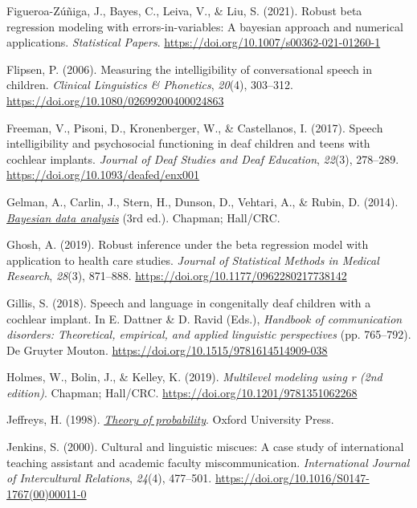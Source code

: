 \documentclass[
]{agujournal2019}
\newlength{\cslhangindent}
\newenvironment{CSLReferences}[2] %
 {\begin{list}{}{%
  \setlength{\itemindent}{0pt}
  \setlength{\leftmargin}{0pt}
  \setlength{\parsep}{0pt}
  \ifodd #1
   \setlength{\leftmargin}{\cslhangindent}
   \setlength{\itemindent}{-1\cslhangindent}
  \fi
  \setlength{\itemsep}{#2\baselineskip}}}
 {\end{list}}
\begin{document}
\begin{CSLReferences}{1}{0}
Figueroa-Zúñiga, J., Bayes, C., Leiva, V., \& Liu, S. (2021). Robust
beta regression modeling with errors-in-variables: A bayesian approach
and numerical applications. \emph{Statistical Papers}.
\url{https://doi.org/10.1007/s00362-021-01260-1}

Flipsen, P. (2006). Measuring the intelligibility of conversational
speech in children. \emph{Clinical Linguistics \& Phonetics},
\emph{20}(4), 303--312. \url{https://doi.org/10.1080/02699200400024863}

Freeman, V., Pisoni, D., Kronenberger, W., \& Castellanos, I. (2017).
Speech intelligibility and psychosocial functioning in deaf children and
teens with cochlear implants. \emph{Journal of Deaf Studies and Deaf
Education}, \emph{22}(3), 278--289.
\url{https://doi.org/10.1093/deafed/enx001}

Gelman, A., Carlin, J., Stern, H., Dunson, D., Vehtari, A., \& Rubin, D.
(2014). \emph{\href{}{Bayesian data analysis}} (3rd ed.). Chapman;
Hall/CRC.

Ghosh, A. (2019). Robust inference under the beta regression model with
application to health care studies. \emph{Journal of Statistical Methods
in Medical Research}, \emph{28}(3), 871--888.
\url{https://doi.org/10.1177/0962280217738142}

Gillis, S. (2018). Speech and language in congenitally deaf children
with a cochlear implant. In E. Dattner \& D. Ravid (Eds.),
\emph{Handbook of communication disorders: Theoretical, empirical, and
applied linguistic perspectives} (pp. 765--792). De Gruyter Mouton.
\url{https://doi.org/10.1515/9781614514909-038}

Holmes, W., Bolin, J., \& Kelley, K. (2019). \emph{Multilevel modeling
using r (2nd edition)}. Chapman; Hall/CRC.
\url{https://doi.org/10.1201/9781351062268}

Jeffreys, H. (1998). \emph{\href{}{Theory of probability}}. Oxford
University Press.

Jenkins, S. (2000). Cultural and linguistic miscues: A case study of
international teaching assistant and academic faculty miscommunication.
\emph{International Journal of Intercultural Relations}, \emph{24}(4),
477--501. \url{https://doi.org/10.1016/S0147-1767(00)00011-0}


\end{CSLReferences}
\end{document}
